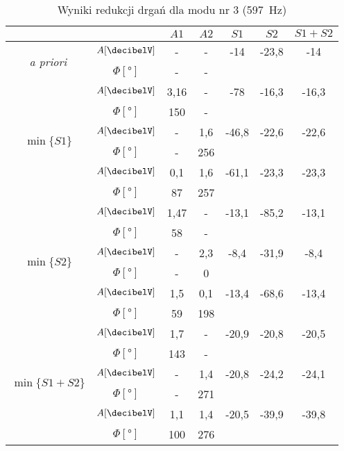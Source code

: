 \documentclass[polish,a4paper,11pt]{mwart}
\begin{document}
  \begin{table}[!tbh]
    \centering
    \caption{Wyniki redukcji drgań dla modu nr 3 (\SI{597}{\hertz})}
    \label{tab:red3}
    \begin{tabular}{|c|c|c|c|c|c|c|}
      \cline{3-7}
      \multicolumn{2}{c|}{}&$A1$&$A2$&$S1$&$S2$&$S1+S2$\\\hline
      \multirow{2}{*}{\textit{a priori}} & $A [\si{\decibelV}]$ & - & - & -14 & -23,8 & -14\\\cline{2-7}
					 & $\Phi [\si{\degree}]$ & - & - & \multicolumn{3}{c}{}\\\hline
      \multirow{6}{*}{$\min\{S1\}$}   &   $A [\si{\decibelV}]$ & 3,16 & - & -78 & -16,3 & -16,3\\\cline{2-7}
				      &$\Phi [\si{\degree}]$ & 150 & - & \multicolumn{3}{c}{}\\\cline{2-7}
				      &   $A [\si{\decibelV}]$ & - & 1,6 & -46,8 & -22,6 & -22,6\\\cline{2-7}
				      &$\Phi [\si{\degree}]$ & - & 256 & \multicolumn{3}{c}{}\\\cline{2-7}
				      &   $A [\si{\decibelV}]$ & 0,1 & 1,6 & -61,1 & -23,3 & -23,3\\\cline{2-7}
				      &$\Phi [\si{\degree}]$ & 87 & 257 & \multicolumn{3}{c}{}\\\hline
      \multirow{6}{*}{$\min\{S2\}$}   &   $A [\si{\decibelV}]$ & 1,47 & - & -13,1 & -85,2 & -13,1\\\cline{2-7}
				      &$\Phi [\si{\degree}]$ & 58 & - & \multicolumn{3}{c}{}\\\cline{2-7}
				      &   $A [\si{\decibelV}]$ & - & 2,3 & -8,4 & -31,9 & -8,4\\\cline{2-7}
				      &$\Phi [\si{\degree}]$ & - & 0 & \multicolumn{3}{c}{}\\\cline{2-7}
				      &   $A [\si{\decibelV}]$ & 1,5 & 0,1 & -13,4 & -68,6 & -13,4\\\cline{2-7}
				      &$\Phi [\si{\degree}]$ & 59 & 198 & \multicolumn{3}{c}{}\\\hline
      \multirow{6}{*}{$\min\{S1+S2\}$}&   $A [\si{\decibelV}]$ & 1,7 & - & -20,9 & -20,8 & -20,5\\\cline{2-7}
				      &$\Phi [\si{\degree}]$ & 143 & - & \multicolumn{3}{c}{}\\\cline{2-7}
				      &   $A [\si{\decibelV}]$ & - & 1,4 & -20,8 & -24,2 & -24,1\\\cline{2-7}
				      &$\Phi [\si{\degree}]$ & - & 271 & \multicolumn{3}{c}{}\\\cline{2-7}
				      &   $A [\si{\decibelV}]$ & 1,1 & 1,4 & -20,5 & -39,9 & -39,8\\\cline{2-7}
				      &$\Phi [\si{\degree}]$ & 100 & 276 & \multicolumn{3}{c}{}\\\cline{1-4}
    \end{tabular}
  \end{table}
\end{document}
